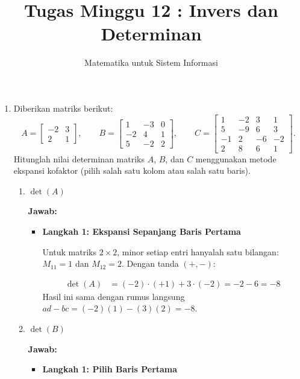 \documentclass[10pt,a4paper]{article}
\title{Tugas Minggu 12 : Invers dan Determinan}
\author{Matematika untuk Sistem Informasi}
\date{}
\newcounter{eqblock}
\newcommand{\reseteq}{%
  \stepcounter{eqblock}%
  \setcounter{equation}{0}%
  \renewcommand{\theHequation}{\arabic{eqblock}.\arabic{equation}}%
}
\begin{document}
\maketitle

\begin{enumerate}

\item Diberikan matriks berikut:
\[
A = \begin{bmatrix} -2 & 3 \\ 2 & 1 \end{bmatrix}, \qquad
B = \begin{bmatrix} 1 & -3 & 0 \\ -2 & 4 & 1 \\ 5 & -2 & 2 \end{bmatrix}, \qquad
C = \begin{bmatrix} 1 & -2 & 3 & 1 \\ 5 & -9 & 6 & 3 \\ -1 & 2 & -6 & -2 \\ 2 & 8 & 6 & 1 \end{bmatrix}.
\]
Hitunglah nilai determinan matriks $A$, $B$, dan $C$ menggunakan metode ekspansi kofaktor (pilih salah satu kolom atau salah satu baris).
\begin{enumerate}

\item $\det(A)$

\textbf{Jawab:}
\begin{itemize}
\item \textbf{Langkah 1: Ekspansi Sepanjang Baris Pertama}

Untuk matriks $2 \times 2$, minor setiap entri hanyalah satu bilangan: $M_{11} = 1$ dan $M_{12} = 2$. Dengan tanda $(+, -)$:
\reseteq
\begin{align}
\det(A) &= (-2) \cdot (+1) + 3 \cdot (-2) = -2 - 6 = -8
\end{align}
Hasil ini sama dengan rumus langsung $ad - bc = (-2)(1) - (3)(2) = -8$.
\end{itemize}

\item $\det(B)$

\textbf{Jawab:}
\begin{itemize}
\item \textbf{Langkah 1: Pilih Baris Pertama}


\end{itemize}
\end{enumerate}
\end{enumerate}
\end{document}
